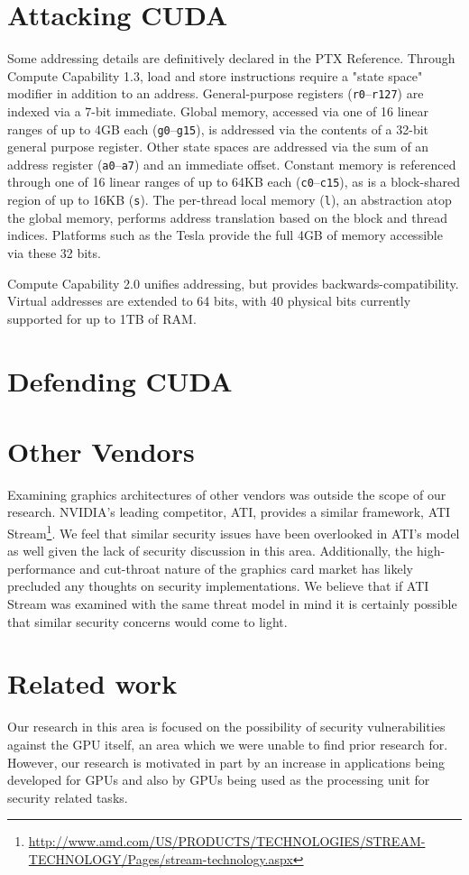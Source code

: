 \documentclass[letterpaper,10pt]{article}
\begin{document}
\begin{multicols}{2}
\section{Attacking CUDA}
Some addressing details are definitively declared in the PTX Reference\cite{ptxguide}.
Through Compute Capability 1.3, load and store instructions require a "state space"
modifier in addition to an address. General-purpose registers (\texttt{r0}--\texttt{r127}) are
indexed via a 7-bit immediate. Global memory, accessed via one of 16 linear ranges
of up to 4GB each (\texttt{g0}--\texttt{g15}), is addressed via the
contents of a 32-bit general purpose register. Other state spaces are addressed
via the sum of an address register (\texttt{a0}--\texttt{a7}) and an immediate
offset. Constant memory is referenced through one of 16 linear ranges of up to
64KB each (\texttt{c0}--\texttt{c15}), as is a block-shared region of up to 16KB
(\texttt{s}). The per-thread local memory (\texttt{l}), an abstraction atop the
global memory, performs address translation based on the block and thread indices.
Platforms such as the Tesla\textsuperscript{\texttrademark} provide the full 
4GB of memory accessible via these 32 bits.

Compute Capability 2.0 unifies addressing, but provides backwards-compatibility.
Virtual addresses are extended to 64 bits, with 40 physical bits currently
supported for up to 1TB of RAM.
\section{Defending CUDA}

\section{Other Vendors}
Examining graphics architectures of other vendors was outside the scope of our research.  NVIDIA's leading competitor, ATI, provides a similar framework, ATI Stream\footnote{\url{http://www.amd.com/US/PRODUCTS/TECHNOLOGIES/STREAM-TECHNOLOGY/Pages/stream-technology.aspx}}.  We feel that similar security issues have been overlooked in ATI's model as well given the lack of security discussion in this area.  Additionally, the high-performance and cut-throat nature of the graphics card market has likely precluded any thoughts on security implementations.  We believe that if ATI Stream was examined with the same threat model in mind it is certainly possible that similar security concerns would come to light.

\section{Related work}
Our research in this area is focused on the possibility of security
vulnerabilities against the GPU itself, an area which we were unable to find
prior research for. However, our research is motivated in part by an increase
in applications being developed for GPUs and also by GPUs being used as the
processing unit for security related tasks.
  

\end{multicols}
\end{document}
